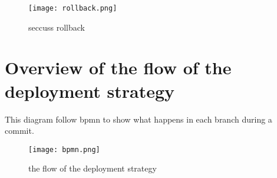 \begin{figure}[H]
    \centering
    \texttt{[image: rollback.png]}
    \caption{seccuss rollback}
    \label{fig:rollback-seccuss}
\end{figure}

\section{Overview of the flow of the deployment strategy}
This diagram follow bpmn to show what happens in each branch during a commit.

\begin{figure}[H]
    \centering
    \texttt{[image: bpmn.png]}
    \caption{the flow of the deployment strategy}
    \label{fig:bpmn}
\end{figure}

